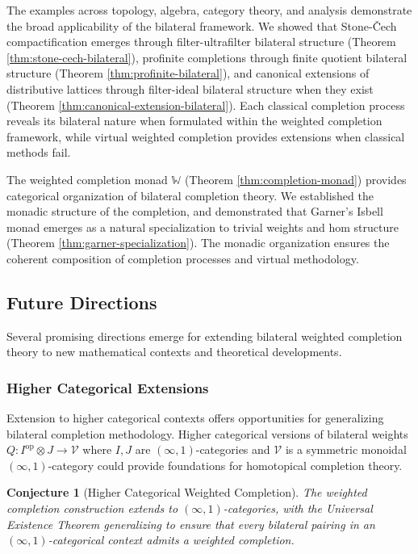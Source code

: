 \documentclass[11pt]{article}
\theoremstyle{plain}
\newtheorem{conjecture}[theorem]{Conjecture}
\theoremstyle{definition}
\theoremstyle{remark}
\newcommand{\V}{\mathcal{V}}
\newcommand{\op}{\mathrm{op}}
\begin{document}
The examples across topology, algebra, category theory, and analysis demonstrate the broad applicability of the bilateral framework. We showed that Stone-\v{C}ech compactification emerges through filter-ultrafilter bilateral structure (Theorem \ref{thm:stone-cech-bilateral}), profinite completions through finite quotient bilateral structure (Theorem \ref{thm:profinite-bilateral}), and canonical extensions of distributive lattices through filter-ideal bilateral structure when they exist (Theorem \ref{thm:canonical-extension-bilateral}). Each classical completion process reveals its bilateral nature when formulated within the weighted completion framework, while virtual weighted completion provides extensions when classical methods fail.

The weighted completion monad $\mathbb{W}$ (Theorem \ref{thm:completion-monad}) provides categorical organization of bilateral completion theory. We established the monadic structure of the completion, and demonstrated that Garner's Isbell monad \cite{garner2018isbell} emerges as a natural specialization to trivial weights and hom structure (Theorem \ref{thm:garner-specialization}). The monadic organization ensures the coherent composition of completion processes and virtual methodology.


\subsection{Future Directions}

Several promising directions emerge for extending bilateral weighted completion theory to new mathematical contexts and theoretical developments.

\subsubsection{Higher Categorical Extensions}

Extension to higher categorical contexts offers opportunities for generalizing bilateral completion methodology. Higher categorical versions of bilateral weights $Q : I^{\op} \otimes J \to \V$ where $I, J$ are $(\infty, 1)$-categories and $\V$ is a symmetric monoidal $(\infty, 1)$-category could provide foundations for homotopical completion theory.

\begin{conjecture}[Higher Categorical Weighted Completion]
The weighted completion construction extends to $(\infty, 1)$-categories, with the Universal Existence Theorem generalizing to ensure that every bilateral pairing in an $(\infty, 1)$-categorical context admits a weighted completion.
\end{conjecture}
\end{document}

